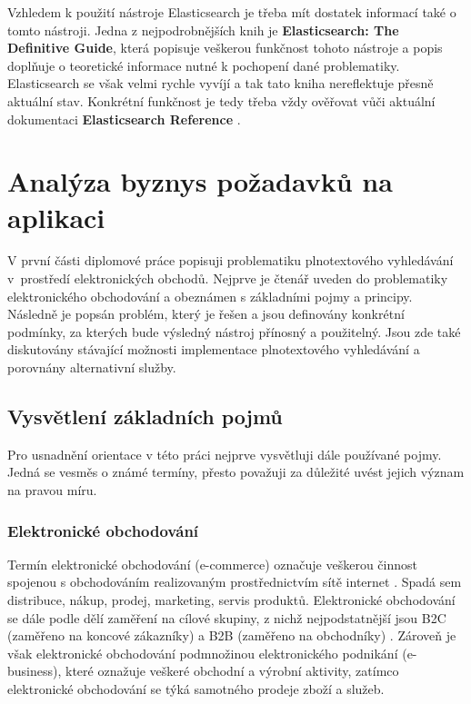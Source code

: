 \documentclass[FM,DP]{tulthesis}
\begin{document}
Vzhledem k použití nástroje Elasticsearch je třeba mít dostatek informací také o tomto nástroji.
Jedna z nejpodrobnějších knih je \textbf{Elasticsearch: The Definitive Guide}, která
popisuje veškerou funkčnost tohoto nástroje a popis doplňuje o teoretické informace nutné
k pochopení dané problematiky. Elasticsearch se však velmi rychle vyvíjí a tak tato kniha
nereflektuje přesně aktuální stav. Konkrétní funkčnost je tedy třeba vždy ověřovat vůči
aktuální dokumentaci \textbf{Elasticsearch Reference} \cite{elastic-reference}.


\chapter{Analýza byznys požadavků na aplikaci}

V první části diplomové práce popisuji problematiku plnotextového vyhledávání 
v~prostředí elektronických obchodů. Nejprve je čtenář uveden do problematiky elektronického
obchodování a obeznámen s základními pojmy a principy. Následně je popsán problém, 
který je řešen a jsou definovány konkrétní podmínky, za kterých bude výsledný nástroj
přínosný a použitelný. Jsou zde také diskutovány stávající možnosti implementace
plnotextového vyhledávání a porovnány alternativní služby.

\section{Vysvětlení základních pojmů}

Pro usnadnění orientace v této práci nejprve vysvětluji dále používané pojmy. Jedná se 
vesměs o známé termíny, přesto považuji za důležité uvést jejich význam na pravou míru.

\subsection*{Elektronické obchodování}

Termín elektronické obchodování (e-commerce) označuje veškerou činnost spojenou s obchodováním
realizovaným prostřednictvím sítě internet \cite[strana~11]{e-commerce}. Spadá sem distribuce, nákup, 
prodej, marketing, servis produktů. Elektronické obchodování se dále podle dělí zaměření na cílové 
skupiny, z nichž nejpodstatnější jsou B2C (zaměřeno na koncové zákazníky) a B2B (zaměřeno na obchodníky) 
\cite[strana~17]{e-commerce}. Zároveň je však elektronické obchodování podmnožinou 
elektronického podnikání (e-business), které oznažuje veškeré obchodní a výrobní aktivity, 
zatímco elektronické obchodování se týká samotného prodeje zboží a služeb.
\end{document}
